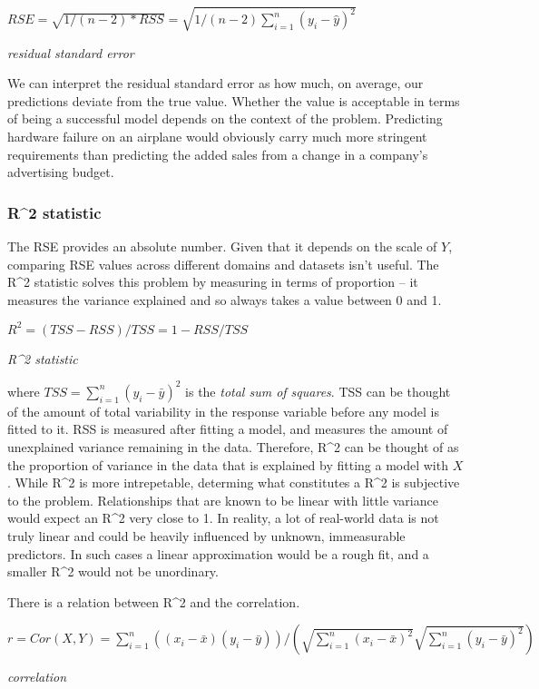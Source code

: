 \documentclass[]{book}
\theoremstyle{definition}
\theoremstyle{definition}
\theoremstyle{definition}
\theoremstyle{remark}
\begin{document}
\(RSE = \sqrt{1/(n-2)*RSS} = \sqrt{1/(n-2)\sum_{i=1}^{n}(y_i - \hat y)^2}\)

\emph{residual standard error}

We can interpret the residual standard error as how much, on average,
our predictions deviate from the true value. Whether the value is
acceptable in terms of being a successful model depends on the context
of the problem. Predicting hardware failure on an airplane would
obviously carry much more stringent requirements than predicting the
added sales from a change in a company's advertising budget.

\subsubsection{R\^{}2 statistic}\label{r2-statistic}

The RSE provides an absolute number. Given that it depends on the scale
of \(Y\), comparing RSE values across different domains and datasets
isn't useful. The R\^{}2 statistic solves this problem by measuring in
terms of proportion -- it measures the variance explained and so always
takes a value between 0 and 1.

\(R^2 = (TSS - RSS)/TSS = 1 - RSS/TSS\)

\emph{R\^{}2 statistic}

where \(TSS = \sum_{i=1}^{n}(y_i-\bar y)^2\) is the \emph{total sum of
squares}. TSS can be thought of the amount of total variability in the
response variable before any model is fitted to it. RSS is measured
after fitting a model, and measures the amount of unexplained variance
remaining in the data. Therefore, R\^{}2 can be thought of as the
proportion of variance in the data that is explained by fitting a model
with \(X\). While R\^{}2 is more intrepetable, determing what
constitutes a R\^{}2 is subjective to the problem. Relationships that
are known to be linear with little variance would expect an R\^{}2 very
close to 1. In reality, a lot of real-world data is not truly linear and
could be heavily influenced by unknown, immeasurable predictors. In such
cases a linear approximation would be a rough fit, and a smaller R\^{}2
would not be unordinary.

There is a relation between R\^{}2 and the correlation.

\(r = Cor(X,Y) = \sum_{i=1}^{n}((x_i-\bar x)(y_i - \bar y))/(\sqrt{\sum_{i=1}^{n}(x_i - \bar x)^2}\sqrt{\sum_{i=1}^{n}(y_i - \bar y)^2})\)

\emph{correlation}
\end{document}
